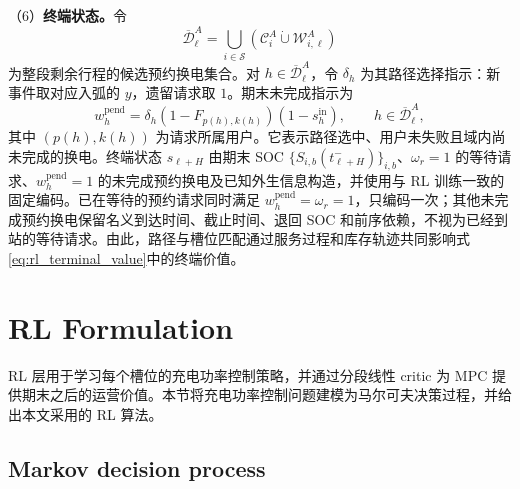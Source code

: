 \documentclass[12pt,a4paper,UTF8]{ctexart}
\begin{document}
（6）\textbf{终端状态。}令
\[
\overline{\mathcal D}_\ell^A
=\bigcup_{i\in\mathcal S}(\mathcal C_i^A\mathbin{\dot\cup}\mathcal W_{i,\ell}^A)
\]
为整段剩余行程的候选预约换电集合。对 $h\in\overline{\mathcal D}_\ell^A$，令 $\delta_h$ 为其路径选择指示：新事件取对应入弧的 $y$，遗留请求取 $1$。期末未完成指示为
\begin{equation}
w_h^{\mathrm{pend}}=\delta_h(1-F_{p(h),k(h)})(1-s_h^{\mathrm{in}}),
\qquad h\in\overline{\mathcal D}_\ell^A,
\label{eq:pending_delivery_alive}
\end{equation}
其中 $(p(h),k(h))$ 为请求所属用户。它表示路径选中、用户未失败且域内尚未完成的换电。终端状态 $s_{\ell+H}$ 由期末 SOC $\{S_{i,b}(t_{\ell+H}^-)\}_{i,b}$、$\omega_r=1$ 的等待请求、$w_h^{\mathrm{pend}}=1$ 的未完成预约换电及已知外生信息构造，并使用与 RL 训练一致的固定编码。已在等待的预约请求同时满足 $w_h^{\mathrm{pend}}=\omega_r=1$，只编码一次；其他未完成预约换电保留名义到达时间、截止时间、退回 SOC 和前序依赖，不视为已经到站的等待请求。由此，路径与槽位匹配通过服务过程和库存轨迹共同影响式\eqref{eq:rl_terminal_value}中的终端价值。


\section{RL Formulation}

RL 层用于学习每个槽位的充电功率控制策略，并通过分段线性 critic 为 MPC 提供期末之后的运营价值。本节将充电功率控制问题建模为马尔可夫决策过程，并给出本文采用的 RL 算法。

\subsection{Markov decision process}
\end{document}
